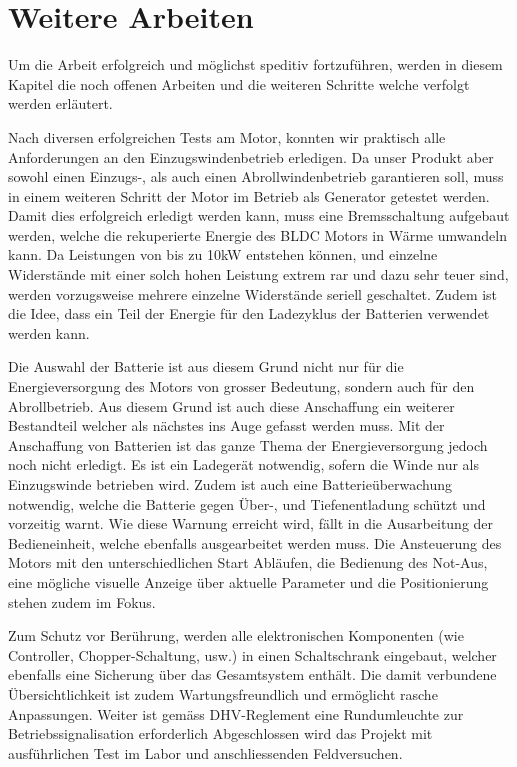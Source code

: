 \section{Weitere Arbeiten}
Um die Arbeit erfolgreich und möglichst speditiv fortzuführen, werden in diesem Kapitel die noch offenen Arbeiten und die weiteren Schritte welche verfolgt werden erläutert.

Nach diversen erfolgreichen Tests am Motor, konnten wir praktisch alle Anforderungen an den Einzugswindenbetrieb erledigen. Da unser Produkt aber sowohl einen Einzugs-, als auch einen Abrollwindenbetrieb garantieren soll, muss in einem weiteren Schritt der Motor im Betrieb als Generator getestet werden. Damit dies erfolgreich erledigt werden kann, muss eine Bremsschaltung aufgebaut werden, welche die rekuperierte Energie des BLDC Motors in Wärme umwandeln kann. Da Leistungen von bis zu 10kW entstehen können, und einzelne Widerstände mit einer solch hohen Leistung extrem rar und dazu sehr teuer sind, werden vorzugsweise mehrere einzelne Widerstände seriell geschaltet. Zudem ist die Idee, dass ein Teil der Energie für den Ladezyklus der Batterien verwendet werden kann.

Die Auswahl der Batterie ist aus diesem Grund nicht nur für die Energieversorgung des Motors von grosser Bedeutung, sondern auch für den Abrollbetrieb. Aus diesem Grund ist auch diese Anschaffung ein weiterer Bestandteil welcher als nächstes ins Auge gefasst werden muss. Mit der Anschaffung von Batterien ist das ganze Thema der Energieversorgung jedoch noch nicht erledigt. Es ist ein Ladegerät notwendig, sofern die Winde nur als Einzugswinde betrieben wird. Zudem ist auch eine Batterieüberwachung notwendig, welche die Batterie gegen Über-, und Tiefenentladung schützt und vorzeitig warnt. Wie diese Warnung erreicht wird, fällt in die Ausarbeitung der Bedieneinheit, welche ebenfalls ausgearbeitet werden muss. Die Ansteuerung des Motors mit den unterschiedlichen Start Abläufen, die Bedienung des Not-Aus, eine mögliche visuelle Anzeige über aktuelle Parameter und die Positionierung stehen zudem im Fokus.

Zum Schutz vor Berührung, werden alle elektronischen Komponenten (wie Controller, Chopper-Schaltung, usw.) in einen Schaltschrank eingebaut, welcher ebenfalls eine Sicherung über das Gesamtsystem enthält. Die damit verbundene Übersichtlichkeit ist zudem Wartungsfreundlich und ermöglicht rasche Anpassungen. Weiter ist gemäss DHV-Reglement eine Rundumleuchte zur Betriebssignalisation erforderlich 
Abgeschlossen wird das Projekt mit ausführlichen Test im Labor und anschliessenden Feldversuchen.